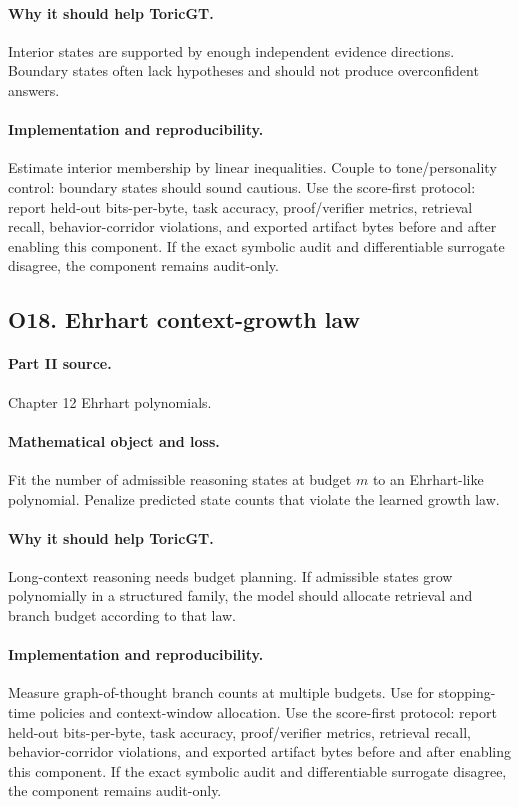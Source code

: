 \documentclass[11pt]{article}
\theoremstyle{definition}
\begin{document}
\paragraph{Why it should help ToricGT.} Interior states are supported by enough independent evidence directions.  Boundary states often lack hypotheses and should not produce overconfident answers.
\paragraph{Implementation and reproducibility.} Estimate interior membership by linear inequalities.  Couple to tone/personality control: boundary states should sound cautious.  Use the score-first protocol: report held-out bits-per-byte, task accuracy, proof/verifier metrics, retrieval recall, behavior-corridor violations, and exported artifact bytes before and after enabling this component.  If the exact symbolic audit and differentiable surrogate disagree, the component remains audit-only.


\subsection{O18. Ehrhart context-growth law}
\paragraph{Part II source.} Chapter 12 Ehrhart polynomials.
\paragraph{Mathematical object and loss.} Fit the number of admissible reasoning states at budget $m$ to an Ehrhart-like polynomial.  Penalize predicted state counts that violate the learned growth law.
\paragraph{Why it should help ToricGT.} Long-context reasoning needs budget planning.  If admissible states grow polynomially in a structured family, the model should allocate retrieval and branch budget according to that law.
\paragraph{Implementation and reproducibility.} Measure graph-of-thought branch counts at multiple budgets.  Use for stopping-time policies and context-window allocation.  Use the score-first protocol: report held-out bits-per-byte, task accuracy, proof/verifier metrics, retrieval recall, behavior-corridor violations, and exported artifact bytes before and after enabling this component.  If the exact symbolic audit and differentiable surrogate disagree, the component remains audit-only.
\end{document}
